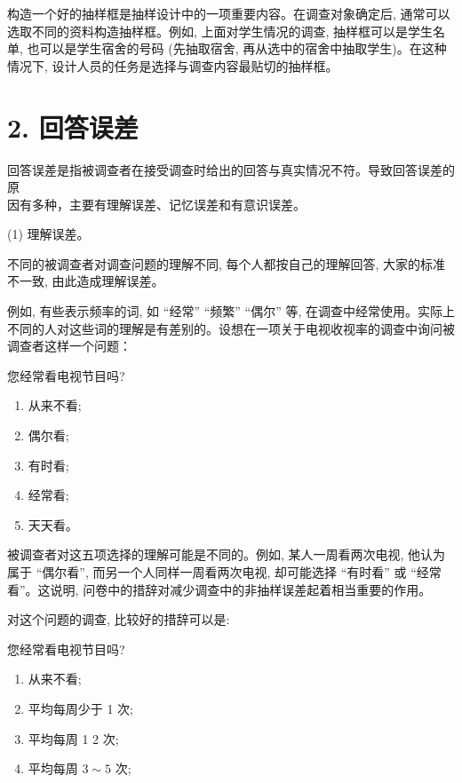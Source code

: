 \documentclass[10pt]{article}
\begin{document}
\begin{CJK*}{UTF8}{bsmi}
构造一个好的抽样框是抽样设计中的一项重要内容。在调查对象确定后, 通常可以选取不同的资料构造抽样框。例如, 上面对学生情况的调查, 抽样框可以是学生名单, 也可以是学生宿舍的号码 (先抽取宿舍, 再从选中的宿舍中抽取学生)。在这种情况下, 设计人员的任务是选择与调查内容最贴切的抽样框。

\section*{2. 回答误差}
回答误差是指被调查者在接受调查时给出的回答与真实情况不符。导致回答误差的原\\
因有多种，主要有理解误差、记忆误差和有意识误差。

(1) 理解误差。

不同的被调查者对调查问题的理解不同, 每个人都按自己的理解回答, 大家的标准不一致, 由此造成理解误差。

例如, 有些表示频率的词, 如 “经常” “频繁” “偶尔” 等, 在调查中经常使用。实际上不同的人对这些词的理解是有差别的。设想在一项关于电视收视率的调查中询问被调查者这样一个问题：

您经常看电视节目吗?

\begin{enumerate}
  \item 从来不看;

  \item 偶尔看;

  \item 有时看;

  \item 经常看;

  \item 天天看。

\end{enumerate}

被调查者对这五项选择的理解可能是不同的。例如, 某人一周看两次电视, 他认为属于 “偶尔看”, 而另一个人同样一周看两次电视, 却可能选择 “有时看” 或 “经常看”。这说明, 问卷中的措辞对减少调查中的非抽样误差起着相当重要的作用。

对这个问题的调查, 比较好的措辞可以是:

您经常看电视节目吗?

\begin{enumerate}
  \item 从来不看;

  \item 平均每周少于 1 次;

  \item 平均每周 1 2 次;

  \item 平均每周 $3 \sim 5$ 次;


\end{enumerate}
\end{CJK*}
\end{document}
